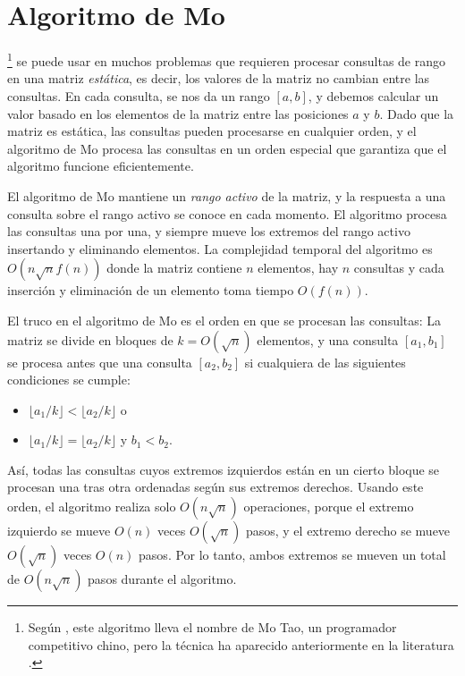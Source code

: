 \section{Algoritmo de Mo}


\footnote{Según \cite{cod15}, este algoritmo
lleva el nombre de Mo Tao, un programador competitivo chino, pero
la técnica ha aparecido anteriormente en la literatura \cite{ken06}.}
se puede usar en muchos problemas
que requieren procesar consultas de rango en
una matriz \emph{estática}, es decir, los valores de la matriz
no cambian entre las consultas.
En cada consulta, se nos da un rango \( [a,b] \),
y debemos calcular un valor basado en los
elementos de la matriz entre las posiciones \( a \) y \( b \).
Dado que la matriz es estática,
las consultas pueden procesarse en cualquier orden,
y el algoritmo de Mo
procesa las consultas en un orden especial que garantiza
que el algoritmo funcione eficientemente.

El algoritmo de Mo mantiene un \emph{rango activo}
de la matriz, y la respuesta a una consulta
sobre el rango activo se conoce en cada momento.
El algoritmo procesa las consultas una por una,
y siempre mueve los extremos del
rango activo insertando y eliminando elementos.
La complejidad temporal del algoritmo es
\( O(n \sqrt n f(n)) \) donde la matriz contiene
\( n \) elementos, hay \( n \) consultas
y cada inserción y eliminación de un elemento
toma tiempo \( O(f(n)) \).

El truco en el algoritmo de Mo es el orden
en que se procesan las consultas:
La matriz se divide en bloques de \( k=O(\sqrt n) \)
elementos, y una consulta \( [a_1,b_1] \)
se procesa antes que una consulta \( [a_2,b_2] \)
si cualquiera de las siguientes condiciones se cumple:
\begin{itemize}
\item \( \lfloor a_1/k \rfloor < \lfloor a_2/k \rfloor \) o
\item \( \lfloor a_1/k \rfloor = \lfloor a_2/k \rfloor \) y \( b_1 < b_2 \).
\end{itemize}

Así, todas las consultas cuyos extremos izquierdos están
en un cierto bloque se procesan una tras otra
ordenadas según sus extremos derechos.
Usando este orden, el algoritmo
realiza solo \( O(n \sqrt n) \) operaciones,
porque el extremo izquierdo se mueve
\( O(n) \) veces \( O(\sqrt n) \) pasos,
y el extremo derecho se mueve
\( O(\sqrt n) \) veces \( O(n) \) pasos. Por lo tanto, ambos
extremos se mueven un total de \( O(n \sqrt n) \) pasos durante el algoritmo.

